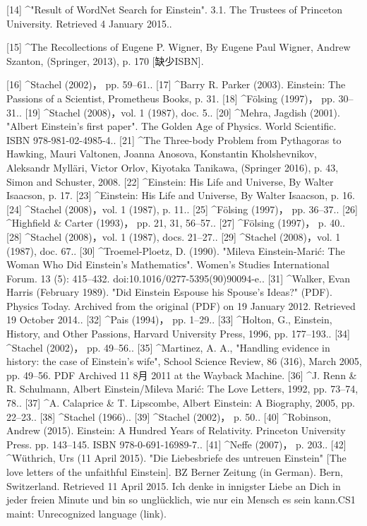 [14]
^"Result of WordNet Search for Einstein". 3.1. The Trustees of Princeton University. Retrieved 4 January 2015..

[15]
^The Recollections of Eugene P. Wigner, By Eugene Paul Wigner, Andrew Szanton, (Springer, 2013), p. 170 [缺少ISBN].

[16]
^Stachel (2002)， pp. 59–61..
[17]
^Barry R. Parker (2003). Einstein: The Passions of a Scientist, Prometheus Books, p. 31.
[18]
^Fölsing (1997)， pp. 30–31..
[19]
^Stachel (2008)，vol. 1 (1987), doc. 5..
[20]
^Mehra, Jagdish (2001). "Albert Einstein's first paper". The Golden Age of Physics. World Scientific. ISBN 978-981-02-4985-4..
[21]
^The Three-body Problem from Pythagoras to Hawking, Mauri Valtonen, Joanna Anosova, Konstantin Kholshevnikov, Aleksandr Mylläri, Victor Orlov, Kiyotaka Tanikawa, (Springer 2016), p. 43, Simon and Schuster, 2008.
[22]
^Einstein: His Life and Universe, By Walter Isaacson, p. 17.
[23]
^Einstein: His Life and Universe, By Walter Isaacson, p. 16.
[24]
^Stachel (2008)，vol. 1 (1987), p. 11..
[25]
^Fölsing (1997)， pp. 36–37..
[26]
^Highfield & Carter (1993)， pp. 21, 31, 56–57..
[27]
^Fölsing (1997)， p. 40..
[28]
^Stachel (2008)，vol. 1 (1987), docs. 21–27..
[29]
^Stachel (2008)，vol. 1 (1987), doc. 67..
[30]
^Troemel-Ploetz, D. (1990). "Mileva Einstein-Marić: The Woman Who Did Einstein's Mathematics". Women's Studies International Forum. 13 (5): 415–432. doi:10.1016/0277-5395(90)90094-e..
[31]
^Walker, Evan Harris (February 1989). "Did Einstein Espouse his Spouse's Ideas?" (PDF). Physics Today. Archived from the original (PDF) on 19 January 2012. Retrieved 19 October 2014..
[32]
^Pais (1994)， pp. 1–29..
[33]
^Holton, G., Einstein, History, and Other Passions, Harvard University Press, 1996, pp. 177–193..
[34]
^Stachel (2002)， pp. 49–56..
[35]
^Martinez, A. A., "Handling evidence in history: the case of Einstein's wife", School Science Review, 86 (316), March 2005, pp. 49–56. PDF Archived 11 8月 2011 at the Wayback Machine.
[36]
^J. Renn & R. Schulmann, Albert Einstein/Mileva Marić: The Love Letters, 1992, pp. 73–74, 78..
[37]
^A. Calaprice & T. Lipscombe, Albert Einstein: A Biography, 2005, pp. 22–23..
[38]
^Stachel (1966)..
[39]
^Stachel (2002)， p. 50..
[40]
^Robinson, Andrew (2015). Einstein: A Hundred Years of Relativity. Princeton University Press. pp. 143–145. ISBN 978-0-691-16989-7..
[41]
^Neffe (2007)， p. 203..
[42]
^Wüthrich, Urs (11 April 2015). "Die Liebesbriefe des untreuen Einstein" [The love letters of the unfaithful Einstein]. BZ Berner Zeitung (in German). Bern, Switzerland. Retrieved 11 April 2015. Ich denke in innigster Liebe an Dich in jeder freien Minute und bin so unglücklich, wie nur ein Mensch es sein kann.CS1 maint: Unrecognized language (link).
